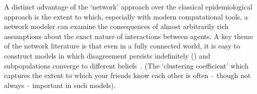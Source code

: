 





    A distinct advantage of the `network' approach over the classical epidemiological approach is the extent to which, especially with modern computational tools, a network modeler can examine the consequences of almost arbitrarily rich assumptions about the exact nature of interactions between agents.  A key theme of the network literature is that even in a fully connected world, it is easy to construct models in which disagreement persists indefinitely (\cite{acemouglu2013opinion}) and subpopulations converge to different beliefs~\cite{sikder2020minimalistic}.  (The `clustering coefficient' which captures the extent to which your friends know each other is often -- though not always -- important in such models).


